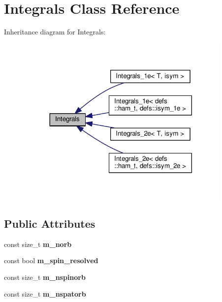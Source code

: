 \hypertarget{classIntegrals}{}\section{Integrals Class Reference}
\label{classIntegrals}


Inheritance diagram for Integrals\+:\nopagebreak
\begin{figure}[H]
\begin{center}
\leavevmode
\includegraphics[width=296pt]{classIntegrals__inherit__graph}
\end{center}
\end{figure}
\subsection*{Public Attributes}
\begin{DoxyCompactItemize}
\item 
const size\+\_\+t {\bfseries m\+\_\+norb}\hypertarget{classIntegrals_a58fcfb338da894a36056842ab6bc8f5c}{}\label{classIntegrals_a58fcfb338da894a36056842ab6bc8f5c}

\item 
const bool {\bfseries m\+\_\+spin\+\_\+resolved}\hypertarget{classIntegrals_ad51ca862d06c5bd6279a2c658e6a0ea5}{}\label{classIntegrals_ad51ca862d06c5bd6279a2c658e6a0ea5}

\item 
const size\+\_\+t {\bfseries m\+\_\+nspinorb}\hypertarget{classIntegrals_a22ad03b1d5386dba7c1426f285cdd081}{}\label{classIntegrals_a22ad03b1d5386dba7c1426f285cdd081}

\item 
const size\+\_\+t {\bfseries m\+\_\+nspatorb}\hypertarget{classIntegrals_a5020b18ab8bdfede8b78c511025b5000}{}\label{classIntegrals_a5020b18ab8bdfede8b78c511025b5000}

\end{DoxyCompactItemize}
